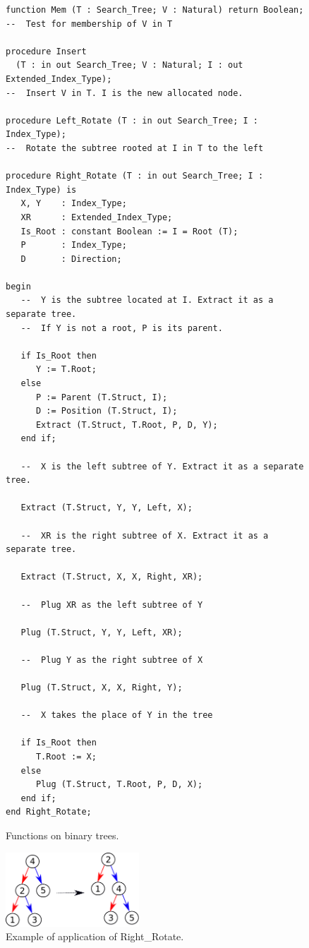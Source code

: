 \documentclass[11pt,a4paper]{article}
\begin{document}
\begin{figure}
\begin{small}
\begin{lstlisting}
function Mem (T : Search_Tree; V : Natural) return Boolean;
--  Test for membership of V in T

procedure Insert
  (T : in out Search_Tree; V : Natural; I : out Extended_Index_Type);
--  Insert V in T. I is the new allocated node.

procedure Left_Rotate (T : in out Search_Tree; I : Index_Type);
--  Rotate the subtree rooted at I in T to the left

procedure Right_Rotate (T : in out Search_Tree; I : Index_Type) is
   X, Y    : Index_Type;
   XR      : Extended_Index_Type;
   Is_Root : constant Boolean := I = Root (T);
   P       : Index_Type;
   D       : Direction;

begin
   --  Y is the subtree located at I. Extract it as a separate tree.
   --  If Y is not a root, P is its parent.

   if Is_Root then
      Y := T.Root;
   else
      P := Parent (T.Struct, I);
      D := Position (T.Struct, I);
      Extract (T.Struct, T.Root, P, D, Y);
   end if;

   --  X is the left subtree of Y. Extract it as a separate tree.

   Extract (T.Struct, Y, Y, Left, X);

   --  XR is the right subtree of X. Extract it as a separate tree.

   Extract (T.Struct, X, X, Right, XR);

   --  Plug XR as the left subtree of Y

   Plug (T.Struct, Y, Y, Left, XR);

   --  Plug Y as the right subtree of X

   Plug (T.Struct, X, X, Right, Y);

   --  X takes the place of Y in the tree

   if Is_Root then
      T.Root := X;
   else
      Plug (T.Struct, T.Root, P, D, X);
   end if;
end Right_Rotate;
\end{lstlisting}
\end{small}
\caption{\label{fig-search-fun} Functions on binary trees.}
\end{figure}
\begin{figure}[ht]
\begin{center}
\includegraphics[width=5cm]{rotate_right.pdf}
\caption{\label{fig-search-fun2} Example of application of Right\_Rotate.}
\end{center}
\end{figure}
\end{document}
